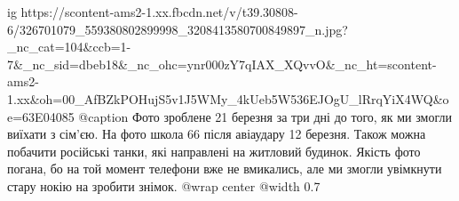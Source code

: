  
 
 
 
 


\ifcmt
  ig https://scontent-ams2-1.xx.fbcdn.net/v/t39.30808-6/326701079_559380802899998_3208413580700849897_n.jpg?_nc_cat=104&ccb=1-7&_nc_sid=dbeb18&_nc_ohc=ynr000zY7qIAX_XQvvO&_nc_ht=scontent-ams2-1.xx&oh=00_AfBZkPOHujS5v1J5WMy_4kUeb5W536EJOgU_lRrqYiX4WQ&oe=63E04085
  @caption Фото зроблене 21 березня за три дні до того, як ми змогли виїхати з сім'єю. На фото школа 66 після авіаудару 12 березня. Також можна побачити російські танки, які направлені на житловий будинок. Якість фото погана, бо на той момент телефони вже не вмикались, але ми змогли увімкнути стару нокію на зробити знімок.
  @wrap center
  @width 0.7
\fi

